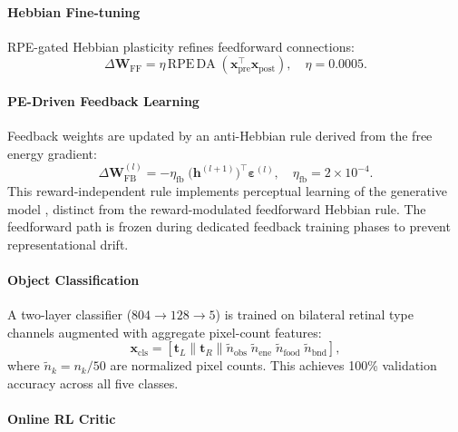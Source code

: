 \documentclass[12pt]{article}
\begin{document}
\paragraph{Hebbian Fine-tuning}

RPE-gated Hebbian plasticity refines feedforward connections:
\begin{equation}\label{eq:hebbian}
  \Delta\mathbf{W}_\text{FF} = \eta\,\text{RPE}\,\text{DA}\;
    (\mathbf{x}_\text{pre}^\top \mathbf{x}_\text{post}),
  \quad \eta = 0.0005.
\end{equation}

\paragraph{PE-Driven Feedback Learning}

Feedback weights are updated by an anti-Hebbian rule derived from
the free energy gradient:
\begin{equation}\label{eq:feedback}
  \Delta\mathbf{W}_\text{FB}^{(l)} =
    -\eta_\text{fb}\;\bigl(\mathbf{h}^{(l+1)}\bigr)^\top
    \boldsymbol{\varepsilon}^{(l)},
  \quad \eta_\text{fb} = 2 \times 10^{-4}.
\end{equation}
This reward-independent rule implements perceptual learning of the
generative model \citep{rao1999,bogacz2017}, distinct from the
reward-modulated feedforward Hebbian rule.
The feedforward path is frozen during dedicated feedback training
phases to prevent representational drift.

\paragraph{Object Classification}

A two-layer classifier ($804 \to 128 \to 5$) is trained on bilateral
retinal type channels augmented with aggregate pixel-count features:
\begin{equation}\label{eq:classifier}
  \mathbf{x}_\text{cls} = [\mathbf{t}_L \| \mathbf{t}_R \|
    \tilde{n}_\text{obs}\;\tilde{n}_\text{ene}\;
    \tilde{n}_\text{food}\;\tilde{n}_\text{bnd}],
\end{equation}
where $\tilde{n}_k = n_k/50$ are normalized pixel counts.
This achieves 100\% validation accuracy across all five classes.

\paragraph{Online RL Critic}
\end{document}
